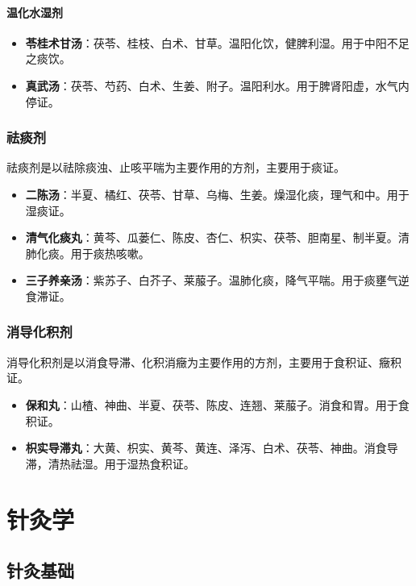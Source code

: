 \documentclass[12pt,UTF8]{ctexbook}
\begin{document}
\subsubsection{温化水湿剂}

\begin{itemize}
\item \textbf{苓桂术甘汤}：茯苓、桂枝、白术、甘草。温阳化饮，健脾利湿。用于中阳不足之痰饮。
\item \textbf{真武汤}：茯苓、芍药、白术、生姜、附子。温阳利水。用于脾肾阳虚，水气内停证。
\end{itemize}

\subsection{祛痰剂}

祛痰剂是以祛除痰浊、止咳平喘为主要作用的方剂，主要用于痰证。

\begin{itemize}
\item \textbf{二陈汤}：半夏、橘红、茯苓、甘草、乌梅、生姜。燥湿化痰，理气和中。用于湿痰证。
\item \textbf{清气化痰丸}：黄芩、瓜蒌仁、陈皮、杏仁、枳实、茯苓、胆南星、制半夏。清肺化痰。用于痰热咳嗽。
\item \textbf{三子养亲汤}：紫苏子、白芥子、莱菔子。温肺化痰，降气平喘。用于痰壅气逆食滞证。
\end{itemize}

\subsection{消导化积剂}

消导化积剂是以消食导滞、化积消癥为主要作用的方剂，主要用于食积证、癥积证。

\begin{itemize}
\item \textbf{保和丸}：山楂、神曲、半夏、茯苓、陈皮、连翘、莱菔子。消食和胃。用于食积证。
\item \textbf{枳实导滞丸}：大黄、枳实、黄芩、黄连、泽泻、白术、茯苓、神曲。消食导滞，清热祛湿。用于湿热食积证。
\end{itemize}

\chapter{针灸学}

\section{针灸基础}
\end{document}
